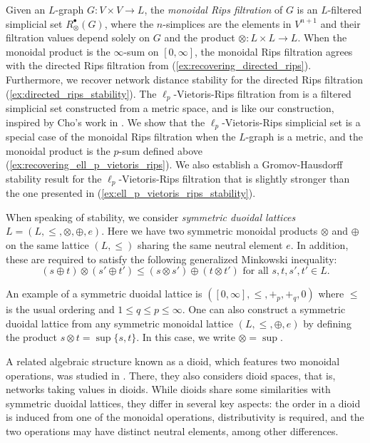 \documentclass[a4paper,11pt]{article}
\newcommand{\tensor}{\otimes}
\newcommand{\atensor}{\oplus}
\theoremstyle{remark}
\begin{document}
Given an $L$-graph $G\colon V\times V\to L$, the \emph{monoidal Rips filtration} of $G$ is an $L$-filtered simplicial set $R^\bullet_\tensor(G)$, where the $n$-simplices are the elements in $V^{n+1}$ and their filtration values depend solely on $G$ and the product $\tensor\colon L\times L\to L$. When the monoidal product is the $\infty$-sum on $[0,\infty]$, the monoidal Rips filtration agrees with the directed Rips filtration from \cite{turner2019rips} (\cref{ex:recovering_directed_rips}). Furthermore, we recover network distance stability for the directed Rips filtration (\cref{ex:directed_rips_stability}). The $\ell_p$-Vietoris-Rips filtration from \cite{ivanov2024ell_p} is a filtered simplicial set constructed from a metric space, and is like our construction, inspired by Cho's work in \cite{cho}. We show that the $\ell_p$-Vietoris-Rips simplicial set is a special case of the monoidal Rips filtration when the $L$-graph is a metric, and the monoidal product is the $p$-sum defined above (\cref{ex:recovering_ell_p_vietoris_rips}). We also establish a Gromov-Hausdorff stability result for the $\ell_p$-Vietoris-Rips filtration that is slightly stronger than the one presented in \cite{ivanov2024ell_p} (\cref{ex:ell_p_vietoris_rips_stability}). %

When speaking of stability, we consider \emph{symmetric duoidal lattices} $L=(L,\leq,\tensor,\atensor,e)$. Here we have two symmetric monoidal products $\tensor$ and $\atensor$ on the same lattice $(L,\leq)$ sharing the same neutral element $e$. In addition, these are required to satisfy the following generalized Minkowski inequality:
\begin{equation*}
(s\atensor t)\tensor(s'\atensor t')\leq (s\tensor s')\atensor(t\tensor t')\text{ for all }s,t,s',t'\in L.
\end{equation*}

An example of a symmetric duoidal lattice is $([0,\infty],\leq, +_p,+_q,0)$ where $\leq$ is the usual ordering and $1\leq q\leq p\leq \infty$. One can also construct a symmetric duoidal lattice from any symmetric monoidal lattice $(L,\leq,\atensor,e)$ by defining the product $s\tensor t=\sup\{s,t\}$. In this case, we write $\tensor=\sup$.

A related algebraic structure known as a dioid, which features two monoidal operations, was studied in \cite{segarra2016thesis}. There, they also considers dioid spaces, that is, networks taking values in dioids. While dioids share some similarities with symmetric duoidal lattices, they differ in several key aspects: the order in a dioid is induced from one of the monoidal operations, distributivity is required, and the two operations may have distinct neutral elements, among other differences.
\end{document}
